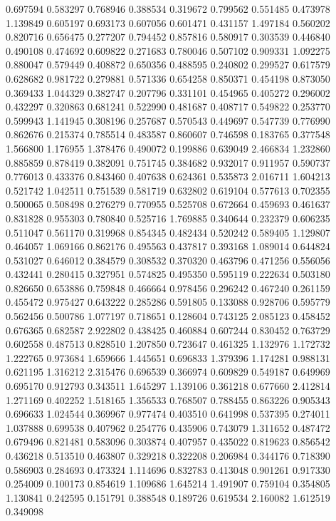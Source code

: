0.697594
0.583297
0.768946
0.388534
0.319672
0.799562
0.551485
0.473978
1.139849
0.605197
0.693173
0.607056
0.601471
0.431157
1.497184
0.560202
0.820716
0.656475
0.277207
0.794452
0.857816
0.580917
0.303539
0.446840
0.490108
0.474692
0.609822
0.271683
0.780046
0.507102
0.909331
1.092275
0.880047
0.579449
0.408872
0.650356
0.488595
0.240802
0.299527
0.617579
0.628682
0.981722
0.279881
0.571336
0.654258
0.850371
0.454198
0.873050
0.369433
1.044329
0.382747
0.207796
0.331101
0.454965
0.405272
0.296002
0.432297
0.320863
0.681241
0.522990
0.481687
0.408717
0.549822
0.253770
0.599943
1.141945
0.308196
0.257687
0.570543
0.449697
0.547739
0.776990
0.862676
0.215374
0.785514
0.483587
0.860607
0.746598
0.183765
0.377548
1.566800
1.176955
1.378476
0.490072
0.199886
0.639049
2.466834
1.232860
0.885859
0.878419
0.382091
0.751745
0.384682
0.932017
0.911957
0.590737
0.776013
0.433376
0.843460
0.407638
0.624361
0.535873
2.016711
1.604213
0.521742
1.042511
0.751539
0.581719
0.632802
0.619104
0.577613
0.702355
0.500065
0.508498
0.276279
0.770955
0.525708
0.672664
0.459693
0.461637
0.831828
0.955303
0.780840
0.525716
1.769885
0.340644
0.232379
0.606235
0.511047
0.561170
0.319968
0.854345
0.482434
0.520242
0.589405
1.129807
0.464057
1.069166
0.862176
0.495563
0.437817
0.393168
1.089014
0.644824
0.531027
0.646012
0.384579
0.308532
0.370320
0.463796
0.471256
0.556056
0.432441
0.280415
0.327951
0.574825
0.495350
0.595119
0.222634
0.503180
0.826650
0.653886
0.759848
0.466664
0.978456
0.296242
0.467240
0.261159
0.455472
0.975427
0.643222
0.285286
0.591805
0.133088
0.928706
0.595779
0.562456
0.500786
1.077197
0.718651
0.128604
0.743125
2.085123
0.458452
0.676365
0.682587
2.922802
0.438425
0.460884
0.607244
0.830452
0.763729
0.602558
0.487513
0.828510
1.207850
0.723647
0.461325
1.132976
1.172732
1.222765
0.973684
1.659666
1.445651
0.696833
1.379396
1.174281
0.988131
0.621195
1.316212
2.315476
0.696539
0.366974
0.609829
0.549187
0.649969
0.695170
0.912793
0.343511
1.645297
1.139106
0.361218
0.677660
2.412814
1.271169
0.402252
1.518165
1.356533
0.768507
0.788455
0.863226
0.905343
0.696633
1.024544
0.369967
0.977474
0.403510
0.641998
0.537395
0.274011
1.037888
0.699538
0.407962
0.254776
0.435906
0.743079
1.311652
0.487472
0.679496
0.821481
0.583096
0.303874
0.407957
0.435022
0.819623
0.856542
0.436218
0.513510
0.463807
0.329218
0.322208
0.206984
0.344176
0.718390
0.586903
0.284693
0.473324
1.114696
0.832783
0.413048
0.901261
0.917330
0.254009
0.100173
0.854619
1.109686
1.645214
1.491907
0.759104
0.354805
1.130841
0.242595
0.151791
0.388548
0.189726
0.619534
2.160082
1.612519
0.349098
